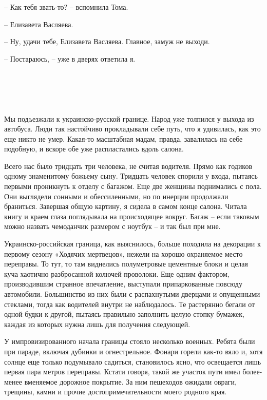 \documentclass[
]{book}
\begin{document}
-- Как тебя звать-то? -- вспомнила Тома.

-- Елизавета Васляева.

-- Ну, удачи тебе, Елизавета Васляева. Главное, замуж не выходи.

-- Постараюсь, -- уже в дверях ответила я.

\hypertarget{chapter-5}{%
\chapter{~}\label{chapter-5}}

Мы подъезжали к украинско-русской границе. Народ уже толпился у выхода из автобуса. Люди так настойчиво прокладывали себе путь, что я удивилась, как это еще никто не умер. Какая-то масштабная мадам, правда, завалилась на себе подобную, и вскоре обе уже распластались вдоль салона.

Всего нас было тридцать три человека, не считая водителя. Прямо как годиков одному знаменитому божьему сыну. Тридцать человек спорили у входа, пытаясь первыми проникнуть к отделу с багажом. Еще две женщины поднимались с пола. Они выглядели сонными и обессиленными, но по инерции продолжали браниться. Завершая общую картину, я сидела в самом конце салона. Читала книгу и краем глаза поглядывала на происходящее вокруг. Багаж -- если таковым можно назвать чемоданчик размером с ноутбук -- и так был при мне.

Украинско-российская граница, как выяснилось, больше походила на декорации к первому сезону «Ходячих мертвецов», нежели на хорошо охраняемое место переправы. То тут, то там виднелись полуметровые цементные блоки и целая куча хаотично разбросанной колючей проволоки. Еще одним фактором, производившим странное впечатление, выступали припаркованные повсюду автомобили. Большинство из них были с распахнутыми дверцами и опущенными стеклами, тогда как водителей внутри не наблюдалось. Те растерянно бегали от одной будки к другой, пытаясь правильно заполнить целую стопку бумажек, каждая из которых нужна лишь для получения следующей.

У импровизированного начала границы стояло несколько военных. Ребята были при параде, включая дубинки и огнестрельное. Фонари горели как-то вяло и, хотя солнце еще только подумывало садиться, становилось ясно, что освещается лишь первая пара метров переправы. Кстати говоря, такой же участок пути имел более-менее вменяемое дорожное покрытие. За ним пешеходов ожидали овраги, трещины, камни и прочие достопримечательности моего родного края.
\end{document}
